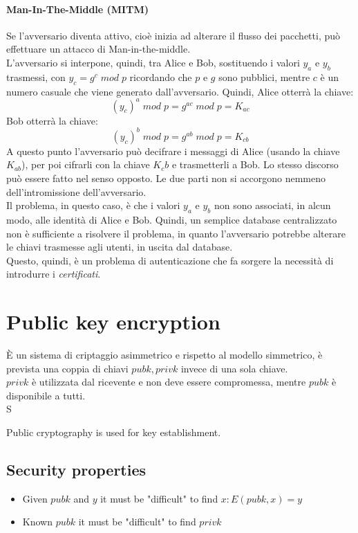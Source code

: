 \documentclass[a4paper,12pt]{article}
\begin{document}
\paragraph{Man-In-The-Middle (MITM)} Se l'avversario diventa attivo, cioè inizia ad alterare il flusso dei pacchetti, può effettuare un attacco di Man-in-the-middle. \\
L'avversario si interpone, quindi, tra Alice e Bob, sostituendo i valori $y_a$ e $y_b$ trasmessi, con $y_c = g^c\;mod\;p$ ricordando che $p$ e $g$ sono pubblici, mentre $c$ è un numero casuale che viene generato dall'avversario.
Quindi, Alice otterrà la chiave: $$(y_c)^a\;mod\;p = g^{ac}\;mod\;p = K_{ac}$$
Bob otterrà la chiave: $$(y_c)^b\;mod\;p = g^{ab}\;mod\;p = K_{cb}$$
A questo punto l'avversario può decifrare i messaggi di Alice (usando la chiave $K_{ab}$), per poi cifrarli con la chiave $K_cb$ e trasmetterli a Bob. 
Lo stesso discorso può essere fatto nel senso opposto. Le due parti non si accorgono nemmeno dell'intromissione dell'avversario. \\
Il problema, in questo caso, è che i valori $y_a$ e $y_b$ non sono associati, in alcun modo, alle identità di Alice e Bob. Quindi, un semplice database centralizzato non è sufficiente a risolvere il problema, in quanto l'avversario potrebbe alterare le chiavi trasmesse agli utenti, in uscita dal database. \\
Questo, quindi, è un problema di autenticazione che fa sorgere la necessità di introdurre i \textit{certificati}.

\newpage

\section{Public key encryption}
È un sistema di criptaggio asimmetrico e rispetto al modello simmetrico, è prevista una coppia di chiavi $pubk,privk$ invece di una sola chiave. \\
$privk$ è utilizzata dal ricevente e non deve essere compromessa, mentre $pubk$ è disponibile a tutti. \\
S

Public cryptography is used for key establishment.

\subsection{Security properties}
\begin{itemize}
	\item Given $pubk$ and $y$ it must be "difficult" to find $x : E(pubk, x) = y$
	\item Known $pubk$ it must be "difficult" to find $privk$
\end{itemize}
\end{document}
